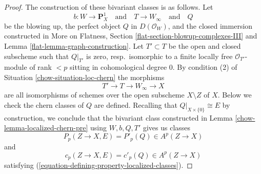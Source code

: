\begin{proof}

The construction of these bivariant classes is as follows. Let
$$
b : W \longrightarrow \mathbf{P}^1_X
\quad\text{and}\quad
T \longrightarrow W_\infty
\quad\text{and}\quad
Q
$$
be the blowing up, the perfect object $Q$ in $D(\mathcal{O}_W)$,
and the closed immersion constructed in
More on Flatness, Section \ref{flat-section-blowup-complexes-III}
and Lemma \ref{flat-lemma-graph-construction}.
Let $T' \subset T$ be the open and closed subscheme such that
$Q|_{T'}$ is zero, resp.\ isomorphic to a
finite locally free $\mathcal{O}_{T'}$-module of rank $< p$
sitting in cohomological degree $0$. By condition (2) of
Situation \ref{chow-situation-loc-chern} the morphisms
$$
T' \to T \to W_\infty \to X
$$
are all isomorphisms of schemes over the open subscheme $X \setminus Z$ of $X$.
Below we check the chern classes of $Q$ are defined.
Recalling that $Q|_{X \times \{0\}} \cong E$ by construction, we conclude
that the bivariant class constructed in Lemma \ref{chow-lemma-localized-chern-pre}
using $W, b, Q, T'$ gives us classes
$$
P_p(Z \to X, E) = P'_p(Q) \in A^p(Z \to X)
$$
and
$$
c_p(Z \to X, E) = c'_p(Q) \in A^p(Z \to X)
$$
satisfying (\ref{equation-defining-property-localized-classes}).


\end{proof}
